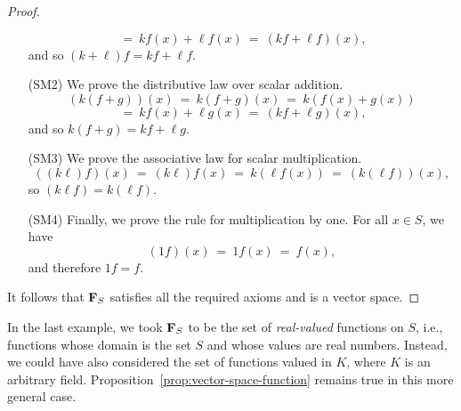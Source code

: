 \begin{proof}
\begin{itemize}
\begin{equation*}
      ~=~ kf(x) + \ell f(x)
      ~=~ (kf + \ell f) (x),
    \end{equation*}
    and so $(k + \ell ) f=kf + \ell f$.
  \item[(SM2)] We prove the distributive law over scalar addition.
    \begin{equation*}
      (k(f + g)) (x)
      ~=~ k(f + g) (x)
      ~=~ k(f(x) + g(x))
    \end{equation*}
    \begin{equation*}
      ~=~ kf(x) + \ell g(x)
      ~=~ (kf + \ell g) (x),
    \end{equation*}
    and so $k(f + g) = kf + \ell g$.
  \item[(SM3)] We prove the associative law for scalar multiplication.
    \begin{equation*}
      ((k\ell ) f) (x)
      ~=~ (k\ell) f(x)
      ~=~ k(\ell f(x))
      ~=~ (k(\ell f)) (x),
    \end{equation*}
    so $(k\ell f) =k(\ell f)$.
  \item[(SM4)] Finally, we prove the rule for multiplication by one.
    For all $x\in S$, we have
    \begin{equation*}
      (1f) ( x) ~=~ 1f(x) ~=~f(x),
    \end{equation*}
    and therefore $1f=f$.
  \end{itemize}

  It follows that $\mathbf{F}_S$ satisfies all the required axioms and is a
  vector space.
\end{proof}

In the last example, we took $\mathbf{F}_S$ to be the set of
\textit{real-valued} functions on $S$, i.e., functions whose domain is
the set $S$ and whose values are real numbers. Instead, we could have
also considered the set of functions valued in $K$, where $K$ is an
arbitrary field. Proposition~\ref{prop:vector-space-function} remains
true in this more general case.
